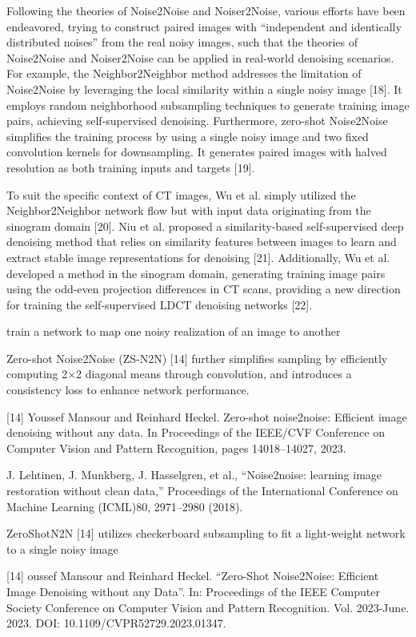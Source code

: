 Following the theories of Noise2Noise and Noiser2Noise, various efforts have been endeavored, trying to construct paired images with “independent and identically distributed noises” from the real noisy images, such that the theories of Noise2Noise and Noiser2Noise can be applied in real-world denoising scenarios. For example, the Neighbor2Neighbor method addresses the limitation of Noise2Noise by leveraging the local similarity within a single noisy image [18]. It employs random neighborhood subsampling techniques to generate training image pairs, achieving self-supervised denoising. Furthermore, zero-shot Noise2Noise simplifies the training process by using a single noisy image and two fixed convolution kernels for downsampling. It generates paired images with halved resolution as both training inputs and targets [19]. %

To suit the specific context of CT images, Wu et al. simply utilized the Neighbor2Neighbor network flow but with input data originating from the sinogram domain [20]. Niu et al. proposed a similarity-based self-supervised deep denoising method that relies on similarity features between images to learn and extract stable image representations for denoising [21]. Additionally, Wu et al. developed a method in the sinogram domain, generating training image pairs using the odd-even projection differences in CT scans, providing a new direction for training the self-supervised LDCT denoising networks [22]. %

train a network to map one noisy realization of an image to another

Zero-shot Noise2Noise (ZS-N2N) [14]
further simplifies sampling by efficiently computing 2×2 diagonal means through convolution, and introduces a
consistency loss to enhance network performance.

[14] Youssef Mansour and Reinhard Heckel. Zero-shot noise2noise: Efficient image denoising without any data. In
Proceedings of the IEEE/CVF Conference on Computer Vision and Pattern Recognition, pages 14018–14027,
2023.


 J. Lehtinen, J. Munkberg, J. Hasselgren, et al., “Noise2noise: learning image restoration without clean data,” Proceedings of the International Conference on Machine Learning (ICML)80, 2971–2980 (2018).

 ZeroShotN2N [14] utilizes checkerboard subsampling to fit a light-weight network to a single noisy image

 [14] oussef Mansour and Reinhard Heckel. “Zero-Shot Noise2Noise: Efficient Image Denoising without any
 Data”. In: Proceedings of the IEEE Computer Society Conference on Computer Vision and Pattern Recognition. Vol. 2023-June. 2023. DOI: 10.1109/CVPR52729.2023.01347.
 
